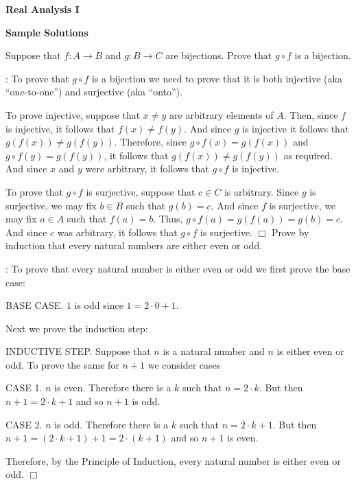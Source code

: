 \documentclass{amsart}
\begin{document}
\centerline{\Large \bf Real Analysis I} 

\vskip 13pt

\centerline{\large \bf Sample Solutions}

\vskip 13pt

 Suppose that $f:A\rightarrow B$ and $g:B\rightarrow C$ are bijections. Prove that $g\circ f$ is a bijection. 

\vskip 6pt

: To prove that $g\circ f$ is a bijection we need to prove that it is both injective (aka ``one-to-one'') and surjective (aka ``onto'').

To prove injective, suppose that $x\not= y$ are arbitrary elements of $A$. Then, since $f$ is injective, it follows that $f(x)\not=f(y)$. And since $g$ is injective it follows that $g(f(x))\not=g(f(y))$. Therefore, since $g\circ f(x) =g(f(x))$ and $g\circ f(y)=g(f(y))$, it follows that $g(f(x))\not = g(f(y))$ as required.  And since $x$ and $y$ were arbitrary, it follows that $g\circ f$ is injective. 

To prove that $g\circ f$ is surjective, suppose that $c\in C$ is arbitrary. Since $g$ is surjective, we may fix $b\in B$ such that $g(b)=c$. And since $f$ is surjective, we may fix $a\in A$ such that $f(a)=b$.  Thus, $g\circ f (a)=g(f(a))=g(b)=c$. And since $c$ was arbitrary, it follows that $g\circ f$ is surjective. 
\hfill$\Box$
\vskip 13pt
 Prove by induction that every natural numbers are either even or odd. 

\vskip 6pt

: To prove that every natural number is either even or odd we first prove the base case:

\noindent BASE CASE. $1$ is odd since $1=2\cdot 0+1$.

Next we prove the induction step:

\noindent INDUCTIVE STEP. Suppose that $n$ is a natural number and $n$ is either even or odd.  To prove the same for $n+1$ we consider cases

\noindent CASE 1. $n$ is even. Therefore there is a $k$ such that $n=2\cdot k$. But then $n+1=2\cdot k +1$ and so $n+1$ is odd. 

\noindent CASE 2. $n$ is odd. Therefore there is a $k$ such that $n=2\cdot k +1$. But then $n+1=(2\cdot k +1)+1=2\cdot(k+1)$ and so $n+1$ is even. 

Therefore, by the Principle of Induction, every natural number is either even or odd. \hfill$\Box$
\end{document}
